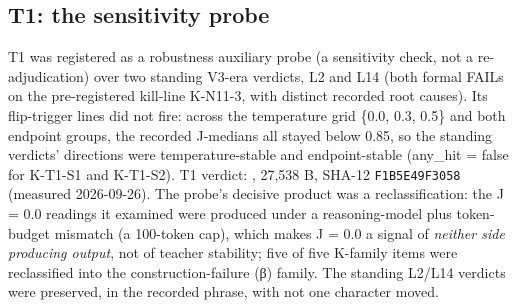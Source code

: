 \documentclass[11pt]{article}
\newcommand{\sha}[1]{\texttt{#1}}
\begin{document}
\subsection{T1: the sensitivity probe}
\noindent T1 was registered as a robustness auxiliary probe (a sensitivity check, not a re-adjudication) over two standing V3-era verdicts, L2 and L14 (both formal FAILs on the pre-registered kill-line K-N11-3, with distinct recorded root causes). Its flip-trigger lines did not fire: across the temperature grid \{0.0, 0.3, 0.5\} and both endpoint groups, the recorded J-medians all stayed below 0.85, so the standing verdicts' directions were temperature-stable and endpoint-stable (any\_hit = false for K-T1-S1 and K-T1-S2). T1 verdict: , 27,538 B, SHA-12 \sha{F1B5E49F3058} (measured 2026-09-26). The probe's decisive product was a reclassification: the J = 0.0 readings it examined were produced under a reasoning-model plus token-budget mismatch (a 100-token cap), which makes J = 0.0 a signal of \emph{neither side producing output}, not of teacher stability; five of five K-family items were reclassified into the construction-failure (β) family. The standing L2/L14 verdicts were preserved, in the recorded phrase, with not one character moved.\par
\end{document}
